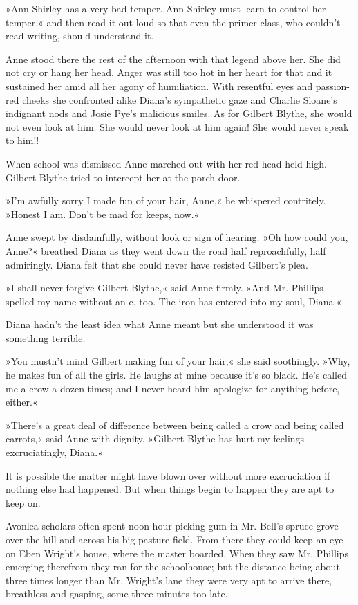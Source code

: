»Ann Shirley has a very bad temper. Ann Shirley must learn to control her temper,« and then read it out loud so that even the primer class, who couldn’t read writing, should understand it.

Anne stood there the rest of the afternoon with that legend above her. She did not cry or hang her head. Anger was still too hot in her heart for that and it sustained her amid all her agony of humiliation. With resentful eyes and passion-red cheeks she confronted alike Diana’s sympathetic gaze and Charlie Sloane’s indignant nods and Josie Pye’s malicious smiles. As for Gilbert Blythe, she would not even look at him. She would never look at him again! She would never speak to him!!

When school was dismissed Anne marched out with her red head held high. Gilbert Blythe tried to intercept her at the porch door.

»I’m awfully sorry I made fun of your hair, Anne,« he whispered contritely. »Honest I am. Don’t be mad for keeps, now.«

Anne swept by disdainfully, without look or sign of hearing. »Oh how could you, Anne?« breathed Diana as they went down the road half reproachfully, half admiringly. Diana felt that she could never have resisted Gilbert’s plea.

»I shall never forgive Gilbert Blythe,« said Anne firmly. »And Mr. Phillips spelled my name without an e, too. The iron has entered into my soul, Diana.«

Diana hadn’t the least idea what Anne meant but she understood it was something terrible.

»You mustn’t mind Gilbert making fun of your hair,« she said soothingly. »Why, he makes fun of all the girls. He laughs at mine because it’s so black. He’s called me a crow a dozen times; and I never heard him apologize for anything before, either.«

»There’s a great deal of difference between being called a crow and being called carrots,« said Anne with dignity. »Gilbert Blythe has hurt my feelings excruciatingly, Diana.«

It is possible the matter might have blown over without more excruciation if nothing else had happened. But when things begin to happen they are apt to keep on.

Avonlea scholars often spent noon hour picking gum in Mr. Bell’s spruce grove over the hill and across his big pasture field. From there they could keep an eye on Eben Wright’s house, where the master boarded. When they saw Mr. Phillips emerging therefrom they ran for the schoolhouse; but the distance being about three times longer than Mr. Wright’s lane they were very apt to arrive there, breathless and gasping, some three minutes too late.

